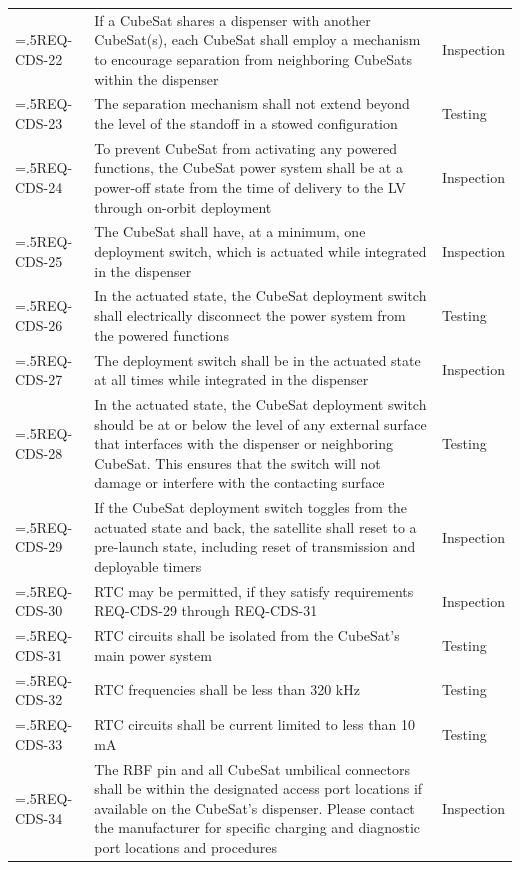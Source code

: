 \begin{tabularx}{\columnwidth}{
    >{\hsize=.5\hsize \arraybackslash}X
    >{\hsize=1.5\hsize \arraybackslash}X
    >{\centering\arraybackslash}X}
    REQ-CDS-22 & If a CubeSat shares a dispenser with another CubeSat(s), each CubeSat shall employ a mechanism to encourage separation from neighboring CubeSats within the dispenser & Inspection \\
    REQ-CDS-23 &  The separation mechanism shall not extend beyond the level of the standoff in a stowed configuration & Testing \\
    REQ-CDS-24 &  To prevent CubeSat from activating any powered functions, the CubeSat power system shall be at a power-off state from the time of delivery to the LV through on-orbit deployment & Inspection \\
    REQ-CDS-25 &  The CubeSat shall have, at a minimum, one deployment switch, which is actuated while integrated in the dispenser & Inspection \\
    REQ-CDS-26 & In the actuated state, the CubeSat deployment switch shall electrically disconnect the power system from the powered functions & Testing \\
    REQ-CDS-27 &  The deployment switch shall be in the actuated state at all times while integrated in the dispenser & Inspection \\
    REQ-CDS-28 &  In the actuated state, the CubeSat deployment switch should be at or below the level of any external surface that interfaces with the dispenser or neighboring CubeSat. This ensures that the switch will not damage or interfere with the contacting surface & Testing \\
    REQ-CDS-29 &  If the CubeSat deployment switch toggles from the actuated state and back, the satellite shall reset to a pre-launch state, including reset of transmission and deployable timers & Inspection \\
    REQ-CDS-30 &  \ac{RTC} may be permitted, if they satisfy requirements REQ-CDS-29 through REQ-CDS-31 & Inspection \\
    REQ-CDS-31 &  \ac{RTC} circuits shall be isolated from the CubeSat’s main power system & Testing \\
    REQ-CDS-32 &  \ac{RTC} frequencies shall be less than 320 kHz & Testing \\
    REQ-CDS-33 &  \ac{RTC} circuits shall be current limited to less than 10 mA & Testing \\
    REQ-CDS-34 &  The \ac{RBF} pin and all CubeSat umbilical connectors shall be within the designated access port locations if available on the CubeSat’s dispenser. Please contact the manufacturer for specific charging and diagnostic port locations and procedures & Inspection \\

\end{tabularx}
